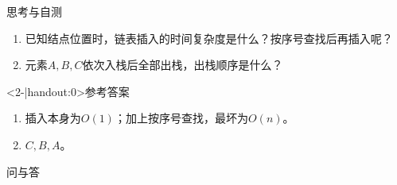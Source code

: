 \begin{frame}{思考与自测}
    \begin{enumerate}
        \item 已知结点位置时，链表插入的时间复杂度是什么？按序号查找后再插入呢？
        \item 元素$A,B,C$依次入栈后全部出栈，出栈顺序是什么？
    \end{enumerate}
    \pause
    \begin{block}<2-|handout:0>{参考答案}
        \begin{enumerate}
            \item 插入本身为$O(1)$；加上按序号查找，最坏为$O(n)$。
            \item $C,B,A$。
        \end{enumerate}
    \end{block}
\end{frame}

\begin{standout}[]
    问与答
\end{standout}